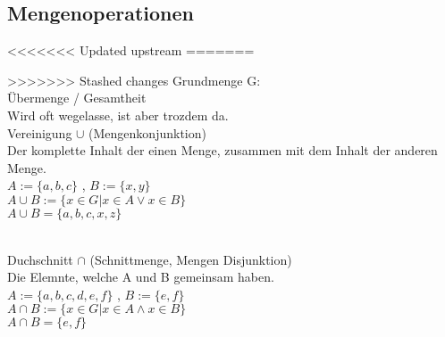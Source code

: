 \documentclass[../gruppenarbeit_1.tex]{subfiles}
\begin{document}
\subsection{Mengenoperationen}
<<<<<<< Updated upstream
=======

>>>>>>> Stashed changes
Grundmenge G:\\
Übermenge / Gesamtheit\\
Wird oft wegelasse, ist aber trozdem da.
\\

Vereinigung $\cup$ (Mengenkonjunktion)\\
Der komplette Inhalt der einen Menge, zusammen mit dem Inhalt der anderen Menge.\\
$A := \{a,b,c\}$ , $B := \{x,y\}$\\
$A \cup B := \{x \in G | x \in A \vee x \in B\}$\\
$A \cup B = \{a,b,c,x,z\}$\\
\\

\newpage

Duchschnitt $\cap$ (Schnittmenge, Mengen Disjunktion)\\
Die Elemnte, welche A und B gemeinsam haben.\\
$A := \{a,b,c,d,e,f\}$ , $B := \{e,f\}$\\
$A \cap B := \{x \in G | x \in A \wedge x \in B\}$\\
$A \cap B = \{e,f\}$\\
\\

\\
\end{document}
